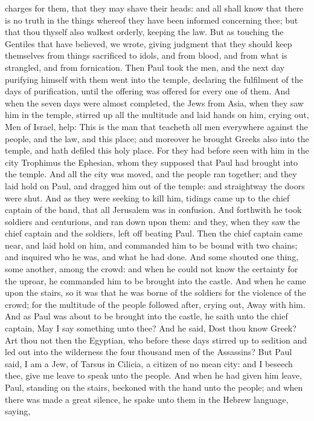 charges for them, that they may shave their heads: and all shall know that there is no truth in the things whereof they have been informed concerning thee; but that thou thyself also walkest orderly, keeping the law. But as touching the Gentiles that have believed, we wrote, giving judgment that they should keep themselves from things sacrificed to idols, and from blood, and from what is strangled, and from fornication. Then Paul took the men, and the next day purifying himself with them went into the temple, declaring the fulfilment of the days of purification, until the offering was offered for every one of them.  And when the seven days were almost completed, the Jews from Asia, when they saw him in the temple, stirred up all the multitude and laid hands on him, crying out, Men of Israel, help: This is the man that teacheth all men everywhere against the people, and the law, and this place; and moreover he brought Greeks also into the temple, and hath defiled this holy place. For they had before seen with him in the city Trophimus the Ephesian, whom they supposed that Paul had brought into the temple. And all the city was moved, and the people ran together; and they laid hold on Paul, and dragged him out of the temple: and straightway the doors were shut. And as they were seeking to kill him, tidings came up to the chief captain of the band, that all Jerusalem was in confusion. And forthwith he took soldiers and centurions, and ran down upon them: and they, when they saw the chief captain and the soldiers, left off beating Paul. Then the chief captain came near, and laid hold on him, and commanded him to be bound with two chains; and inquired who he was, and what he had done. And some shouted one thing, some another, among the crowd: and when he could not know the certainty for the uproar, he commanded him to be brought into the castle. And when he came upon the stairs, so it was that he was borne of the soldiers for the violence of the crowd; for the multitude of the people followed after, crying out, Away with him.  And as Paul was about to be brought into the castle, he saith unto the chief captain, May I say something unto thee? And he said, Dost thou know Greek? Art thou not then the Egyptian, who before these days stirred up to sedition and led out into the wilderness the four thousand men of the Assassins? But Paul said, I am a Jew, of Tarsus in Cilicia, a citizen of no mean city: and I beseech thee, give me leave to speak unto the people. And when he had given him leave, Paul, standing on the stairs, beckoned with the hand unto the people; and when there was made a great silence, he spake unto them in the Hebrew language, saying, 

